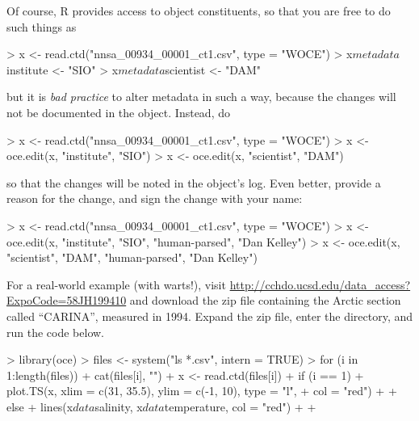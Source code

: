 \documentclass{article}
\begin{document}
Of course, R provides access to object constituents, so that you are
free to do such things as
\begin{Schunk}
\begin{Sinput}
> x <- read.ctd("nnsa_00934_00001_ct1.csv", type = "WOCE")
> x$metadata$institute <- "SIO"
> x$metadata$scientist <- "DAM"
\end{Sinput}
\end{Schunk}
but it is \emph{bad practice} to alter metadata in such a way, because
the changes will not be documented in the object.  Instead, do
\begin{Schunk}
\begin{Sinput}
> x <- read.ctd("nnsa_00934_00001_ct1.csv", type = "WOCE")
> x <- oce.edit(x, "institute", "SIO")
> x <- oce.edit(x, "scientist", "DAM")
\end{Sinput}
\end{Schunk}
so that the changes will be noted in the object's log.  Even better,
provide a reason for the change, and sign the change with your name:
\begin{Schunk}
\begin{Sinput}
> x <- read.ctd("nnsa_00934_00001_ct1.csv", type = "WOCE")
> x <- oce.edit(x, "institute", "SIO", "human-parsed", "Dan Kelley")
> x <- oce.edit(x, "scientist", "DAM", "human-parsed", "Dan Kelley")
\end{Sinput}
\end{Schunk}

For a real-world example (with warts!), visit
\url{http://cchdo.ucsd.edu/data_access?ExpoCode=58JH199410} and download the zip
file containing the Arctic section called ``CARINA'', measured in 1994. Expand
the zip file, enter the directory, and run the code below.
\begin{Schunk}
\begin{Sinput}
> library(oce)
> files <- system("ls *.csv", intern = TRUE)
> for (i in 1:length(files)) {
+     cat(files[i], "\n")
+     x <- read.ctd(files[i])
+     if (i == 1) {
+         plot.TS(x, xlim = c(31, 35.5), ylim = c(-1, 10), type = "l", 
+             col = "red")
+     }
+     else {
+         lines(x$data$salinity, x$data$temperature, col = "red")
+     }
+ }
\end{Sinput}
\end{Schunk}
\end{document}

